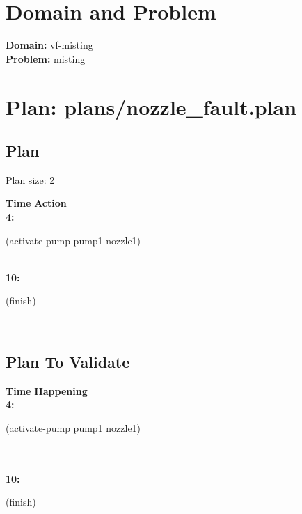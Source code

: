 \documentclass[a4paper,12pt]{article}
\author{\mbox{\sc {\sc Val}}}
\newcommand{\headingtimeaction}{{\bf Time} \qquad \= {\bf Action}\\[0.8ex]}
\newcommand{\headingtimehappening}{{\bf Time} \qquad \= {\bf Happening}\\[0.8ex]}
\newcommand{\atime}[1]{{\bf #1:}}
\newcommand{\action}[1]{{\sf #1}}
\newcommand{\listrow}[1]{\begin{minipage}[t]{11.5cm} #1 \end{minipage}}
\begin{document}
 \maketitle 
\section{Domain and Problem}
{\bf Domain:} vf-misting\\
{\bf Problem:} misting
\section{\sloppy Plan: plans/\-nozzle\_fault.plan}
\subsection{Plan}
Plan size: 2
\begin{tabbing}
\headingtimeaction 
\atime{4} \> \listrow{\action{(activate-pump pump1 nozzle1)}}\\
\atime{10} \> \listrow{\action{(finish)}}\\
\end{tabbing}
\subsection{Plan To Validate}
\begin{tabbing}
\headingtimehappening 
\atime{4}  \> \listrow{\action{(activate-pump pump1 nozzle1)}}\\
\\\atime{10}  \> \listrow{\action{(finish)}}\\
\end{tabbing}
\end{document}
